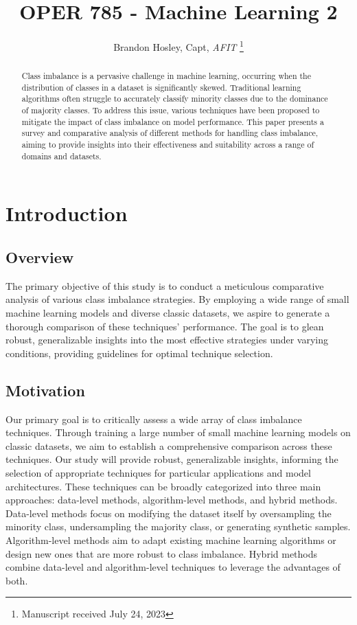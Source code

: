 \documentclass[journal]{IEEEtran}
\title{OPER 785 - Machine Learning 2}
\author{Brandon Hosley, Capt, \textit{AFIT}%
	\thanks{Manuscript received July 24, 2023%
}}
\begin{document}
	
	\maketitle
	
	
	\begin{abstract}
		Class imbalance is a pervasive challenge in machine learning, occurring when the distribution of classes in a dataset is significantly skewed. Traditional learning algorithms often struggle to accurately classify minority classes due to the dominance of majority classes. To address this issue, various techniques have been proposed to mitigate the impact of class imbalance on model performance. This paper presents a survey and comparative analysis of different methods for handling class imbalance, aiming to provide insights into their effectiveness and suitability across a range of domains and datasets.
	\end{abstract}
	
	
	\section{Introduction}
	\subsection{Overview}
		The primary objective of this study is to conduct a meticulous comparative analysis of various class imbalance strategies. By employing a wide range of small machine learning models and diverse classic datasets, we aspire to generate a thorough comparison of these techniques' performance. The goal is to glean robust, generalizable insights into the most effective strategies under varying conditions, providing guidelines for optimal technique selection.
		
	
	\subsection{Motivation}
		Our primary goal is to critically assess a wide array of class imbalance techniques. Through training a large number of small machine learning models on classic datasets, we aim to establish a comprehensive comparison across these techniques. Our study will provide robust, generalizable insights, informing the selection of appropriate techniques for particular applications and model architectures.
		These techniques can be broadly categorized into three main approaches: data-level methods, algorithm-level methods, and hybrid methods. \cite{johnson2019}
		Data-level methods focus on modifying the dataset itself by oversampling the minority class, undersampling the majority class, or generating synthetic samples. Algorithm-level methods aim to adapt existing machine learning algorithms or design new ones that are more robust to class imbalance. Hybrid methods combine data-level and algorithm-level techniques to leverage the advantages of both.
\end{document}
